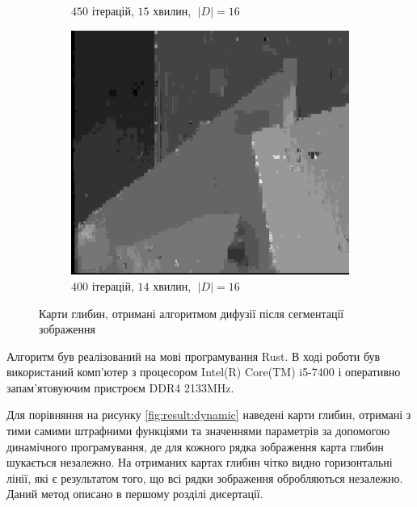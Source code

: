 \begin{figure}[h]
\begin{subfigure}[t]{0.32\textwidth}
        \caption{$450$ ітерацій, $15$ хвилин, $\; \left| D \right| = 16$}
        \label{fig:flowerpots:superpixel}
    \end{subfigure}
    \hfill
    \begin{subfigure}[t]{0.32\textwidth}
        \centering
        \includegraphics[width=\textwidth]{images/poster_superpixel_based_stereo}
        \caption{$400$ ітерацій, $14$ хвилин, $\; \left| D \right| = 16$}
        \label{fig:poster:superpixel}
    \end{subfigure}
    \caption{Карти глибин, отримані алгоритмом дифузії після сегментації зображення}
    \label{fig:result:superpixel}
\end{figure}

Алгоритм був реалізований на мові програмування Rust.
В ході роботи був використаний комп'ютер з процесором
Intel(R) Core(TM) i5-7400 і оперативно запам'ятовуючим пристроєм DDR4 2133MHz.

Для порівняння на рисунку \ref{fig:result:dynamic}
наведені карти глибин,
отримані з тими самими штрафними функціями
та значеннями параметрів за допомогою динамічного програмування,
де для кожного рядка зображення карта глибин шукається незалежно.
На отриманих картах глибин чітко видно горизонтальні лінії,
які є результатом того, що всі рядки зображення обробляються незалежно.
Даний метод описано в першому розділі дисертації.

